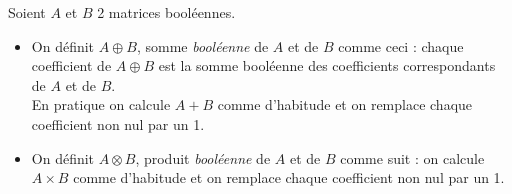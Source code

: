 \begin{definition}
    Soient $A$ et $B$ 2 matrices booléennes.
    \begin{itemize}
        \item 	On définit $A\oplus B$, somme \textit{booléenne} de $A$ et de $B$ comme ceci : chaque coefficient de $A\oplus B$ est la somme booléenne des coefficients correspondants de $A$ et de $B$.\\
              En pratique on calcule $A+B$ comme d'habitude et on remplace chaque coefficient non nul par un 1.
        \item 	On définit $A\otimes B$, produit \textit{booléenne} de $A$ et de $B$ comme suit : on calcule $A\times B$ comme d'habitude et on remplace chaque coefficient non nul par un 1.
    \end{itemize}
\end{definition}
